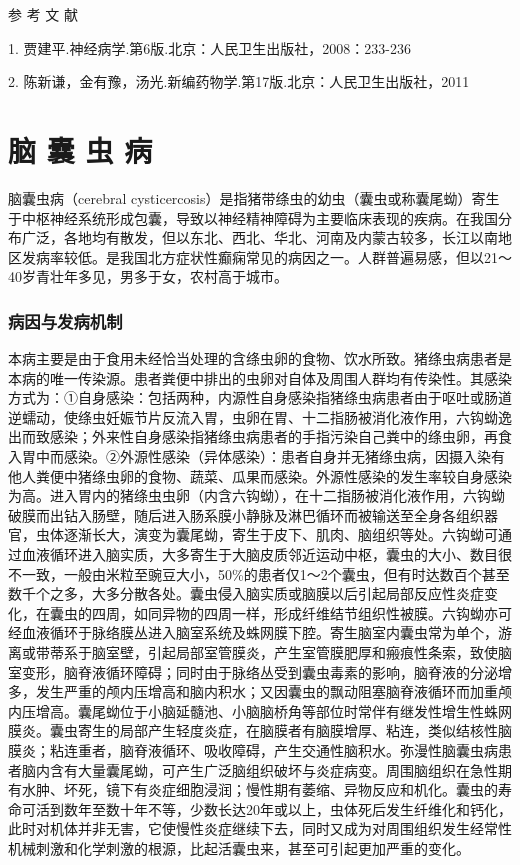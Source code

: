 \protect\hypertarget{text00253.html}{}{}

\hypertarget{text00253.htmlux5cux23CHP8-4-4}{}
参 考 文 献

1. 贾建平.神经病学.第6版.北京：人民卫生出版社，2008：233-236

2. 陈新谦，金有豫，汤光.新编药物学.第17版.北京：人民卫生出版社，2011

\protect\hypertarget{text00254.html}{}{}

\chapter{脑 囊 虫 病}

脑囊虫病（cerebral
cysticercosis）是指猪带绦虫的幼虫（囊虫或称囊尾蚴）寄生于中枢神经系统形成包囊，导致以神经精神障碍为主要临床表现的疾病。在我国分布广泛，各地均有散发，但以东北、西北、华北、河南及内蒙古较多，长江以南地区发病率较低。是我国北方症状性癫痫常见的病因之一。人群普遍易感，但以21～40岁青壮年多见，男多于女，农村高于城市。

\subsection{病因与发病机制}

本病主要是由于食用未经恰当处理的含绦虫卵的食物、饮水所致。猪绦虫病患者是本病的唯一传染源。患者粪便中排出的虫卵对自体及周围人群均有传染性。其感染方式为：①自身感染：包括两种，内源性自身感染指猪绦虫病患者由于呕吐或肠道逆蠕动，使绦虫妊娠节片反流入胃，虫卵在胃、十二指肠被消化液作用，六钩蚴逸出而致感染；外来性自身感染指猪绦虫病患者的手指污染自己粪中的绦虫卵，再食入胃中而感染。②外源性感染（异体感染）：患者自身并无猪绦虫病，因摄入染有他人粪便中猪绦虫卵的食物、蔬菜、瓜果而感染。外源性感染的发生率较自身感染为高。进入胃内的猪绦虫虫卵（内含六钩蚴），在十二指肠被消化液作用，六钩蚴破膜而出钻入肠壁，随后进入肠系膜小静脉及淋巴循环而被输送至全身各组织器官，虫体逐渐长大，演变为囊尾蚴，寄生于皮下、肌肉、脑组织等处。六钩蚴可通过血液循环进入脑实质，大多寄生于大脑皮质邻近运动中枢，囊虫的大小、数目很不一致，一般由米粒至豌豆大小，50\%的患者仅1～2个囊虫，但有时达数百个甚至数千个之多，大多分散各处。囊虫侵入脑实质或脑膜以后引起局部反应性炎症变化，在囊虫的四周，如同异物的四周一样，形成纤维结节组织性被膜。六钩蚴亦可经血液循环于脉络膜丛进入脑室系统及蛛网膜下腔。寄生脑室内囊虫常为单个，游离或带蒂系于脑室壁，引起局部室管膜炎，产生室管膜肥厚和瘢痕性条索，致使脑室变形，脑脊液循环障碍；同时由于脉络丛受到囊虫毒素的影响，脑脊液的分泌增多，发生严重的颅内压增高和脑内积水；又因囊虫的飘动阻塞脑脊液循环而加重颅内压增高。囊尾蚴位于小脑延髓池、小脑脑桥角等部位时常伴有继发性增生性蛛网膜炎。囊虫寄生的局部产生轻度炎症，在脑膜者有脑膜增厚、粘连，类似结核性脑膜炎；粘连重者，脑脊液循环、吸收障碍，产生交通性脑积水。弥漫性脑囊虫病患者脑内含有大量囊尾蚴，可产生广泛脑组织破坏与炎症病变。周围脑组织在急性期有水肿、坏死，镜下有炎症细胞浸润；慢性期有萎缩、异物反应和机化。囊虫的寿命可活到数年至数十年不等，少数长达20年或以上，虫体死后发生纤维化和钙化，此时对机体并非无害，它使慢性炎症继续下去，同时又成为对周围组织发生经常性机械刺激和化学刺激的根源，比起活囊虫来，甚至可引起更加严重的变化。

